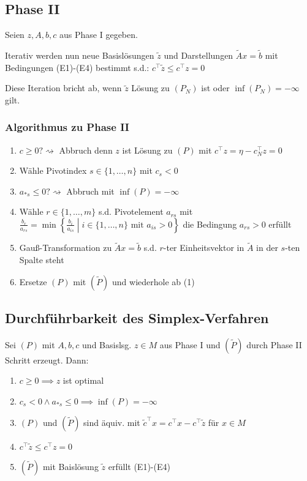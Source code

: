 \subsection*{Phase II}

Seien \(z, A, b, c\) aus Phase I gegeben.

Iterativ werden nun neue Basislösungen \(\tilde z\) und Darstellungen \(\tilde A x = \tilde b\) mit Bedingungen (E1)-(E4) bestimmt s.d.: \(c^\top \tilde z \leq c^\top z = 0\)

Diese Iteration bricht ab, wenn \(\tilde z\) Lösung zu \((P_N)\) ist oder \(\inf (P_N) = -\infty\) gilt.

\subsubsection*{Algorithmus zu Phase II}

\begin{enumerate}[label=(\arabic*)]
	\item \(c \geq 0? \rightsquigarrow\) Abbruch denn \(z\) ist Lösung zu \((P)\) mit \(c^\top z = \eta - c_N^\top z = 0\)
	\item Wähle Pivotindex \(s \in \{1,\dots,n\}\) mit \(c_s < 0\)
	\item \(a_{*s} \leq 0? \rightsquigarrow\) Abbruch mit \(\inf (P) = -\infty\)
	\item Wähle \(r \in \{1,\dots,m\}\) s.d. Pivotelement \(a_{rs}\) mit \(\frac{b_r}{a_{rs}} = \min \left\{ \frac{b_i}{a_{is}} \middle| i \in \{1,\dots,n\} \text{ mit } a_{is} > 0 \right\}\) die Bedingung \(a_{rs} > 0\) erfüllt
	\item Gauß-Transformation zu \(\tilde A x = \tilde b\) s.d. \(r\)-ter Einheitsvektor in \(\tilde A\) in der \(s\)-ten Spalte steht
	\item Ersetze \((P)\) mit \((\tilde P)\) und wiederhole ab (1)
\end{enumerate}

\subsection*{Durchführbarkeit des Simplex-Verfahren}

Sei \((P)\) mit \(A,b,c\) und Basislsg. \(z \in M\) aus Phase I und \((\tilde P)\)  durch Phase II Schritt erzeugt. Dann:

\begin{enumerate}[label=(\alph*)]
	\item \(c \geq 0 \implies z\) ist optimal
	\item \(c_s < 0 \land a_{*s} \leq 0 \implies \inf (P) = -\infty\)
	\item \((P)\) und \((\tilde P)\) sind äquiv. mit \(\tilde c^\top x = c^\top x - c^\top \tilde z\) für \(x \in M\)
	\item \(c^\top \tilde z \leq c^\top z = 0\)
	\item \((\tilde P)\) mit Baislösung \(\tilde z\) erfüllt (E1)-(E4)
\end{enumerate}

